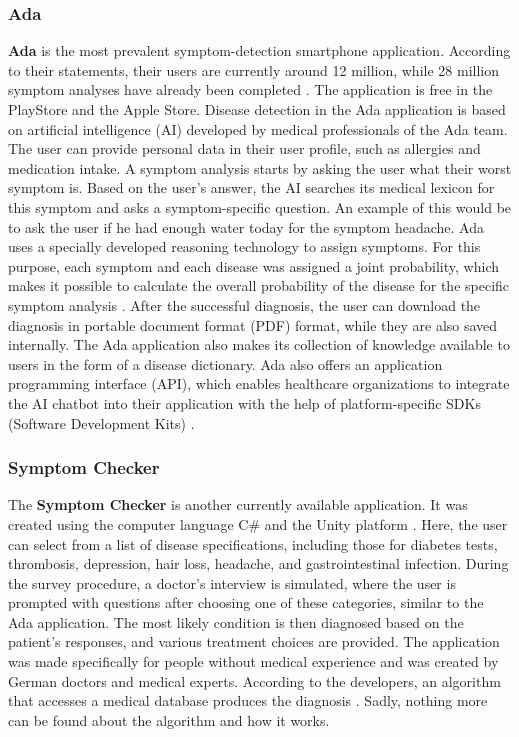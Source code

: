\subsubsection{Ada} 
\textbf{Ada} is the most prevalent symptom-detection smartphone application. According to their statements, their users are currently around 12 million, while 28 million symptom analyses have already been completed \cite{.adaHOME}. The application is free in the PlayStore and the Apple Store. Disease detection in the Ada application is based on artificial intelligence (AI) developed by medical professionals of the Ada team. The user can provide personal data in their user profile, such as allergies and medication intake. A symptom analysis starts by asking the user what their worst symptom is. Based on the user's answer, the AI searches its medical lexicon for this symptom and asks a symptom-specific question.
An example of this would be to ask the user if he had enough water today for the symptom headache. Ada uses a specially developed reasoning technology to assign symptoms. For this purpose, each symptom and each disease was assigned a joint probability, which makes it possible to calculate the overall probability of the disease for the specific symptom analysis \cite{.adaKI}. After the successful diagnosis, the user can download the diagnosis in portable document format (PDF) format, while they are also saved internally. The Ada application also makes its collection of knowledge available to users in the form of a disease dictionary. Ada also offers an application programming interface (API), which enables healthcare organizations to integrate the AI chatbot into their application with the help of platform-specific SDKs (Software Development Kits)\cite{.adaFAQ} \cite{.adaDOCU}.

\subsubsection{Symptom Checker} 
The \textbf{Symptom Checker} is another currently available application. It was created using the computer language C\# and the Unity platform \cite{.symptomchecker}. Here, the user can select from a list of disease specifications, including those for diabetes tests, thrombosis, depression, hair loss, headache, and gastrointestinal infection. During the survey procedure, a doctor's interview is simulated, where the user is prompted with questions after choosing one of these categories, similar to the Ada application. The most likely condition is then diagnosed based on the patient's responses, and various treatment choices are provided. The application was made specifically for people without medical experience and was created by German doctors and medical experts. According to the developers, an algorithm that accesses a medical database produces the diagnosis \cite{.symptomchecker}. Sadly, nothing more can be found about the algorithm and how it works. 

